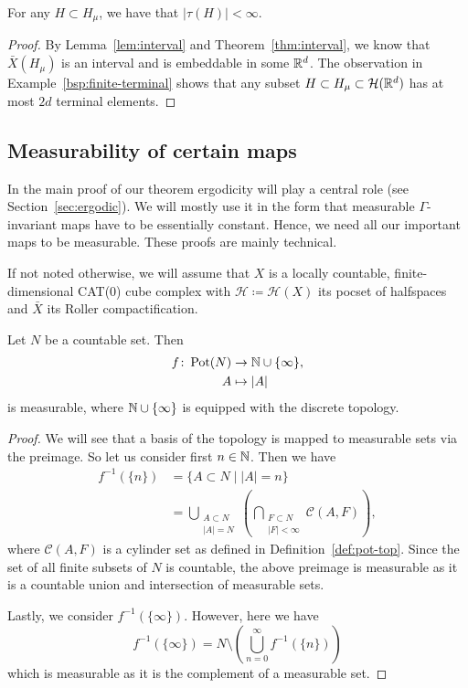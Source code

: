 \begin{lemma}
  \label{lem:finite-terminal}
  For any \(H \subset H_\mu\), we have that \(|\tau(H)| < \infty\).
\end{lemma}

\begin{proof}
  By Lemma~\ref{lem:interval} and Theorem~\ref{thm:interval}, we know that \(\bar X(H_\mu)\) is an interval and is embeddable in some \(\mathbb{R}^d\). The observation in Example~\ref{bsp:finite-terminal} shows that any subset \(H \subset H_\mu \subset \mathcal{H}(\mathbb{R}^d)\) has at most \(2d\) terminal elements.
\end{proof}

\subsection{Measurability of certain maps}
\label{sec:meas-maps}

In the main proof of our theorem ergodicity will play a central role (see Section~\ref{sec:ergodic}). We will mostly use it in the form that measurable \(\Gamma\)-invariant maps have to be essentially constant. Hence, we need all our important maps to be measurable. These proofs are mainly technical.

If not noted otherwise, we will assume that \(X\) is a locally countable, finite-dimensional CAT(0) cube complex with \(\mathcal{H} \coloneqq \mathcal{H}(X)\) its pocset of halfspaces and \(\bar X\) its Roller compactification.

\begin{lemma}
  \label{lem:measurable-countable}
  Let \(N\) be a countable set. Then
  \begin{align*}
    f\colon \operatorname{Pot}(N) &\to \mathbb{N} \cup \{\infty\},\\
    A &\mapsto |A|
  \end{align*}
  is measurable, where \(\mathbb{N} \cup \{\infty\}\) is equipped with the discrete topology.
\end{lemma}

\begin{proof}
  We will see that a basis of the topology is mapped to measurable sets via the preimage. So let us consider first \(n \in \mathbb{N}\). Then we have
  \begin{align*}
    f^{-1}(\{n\})
    & = \{ A \subset N \mid |A| = n\}\\
    & = \bigcup_{\substack{A \subset N\\|A| = N}} \left ( \bigcap_{\substack{F \subset N\\|F|< \infty}}\mathcal{C}(A,F)\right),
  \end{align*}
  where \(\mathcal{C}(A,F)\) is a cylinder set as defined in Definition~\ref{def:pot-top}. Since the set of all finite subsets of \(N\) is countable, the above preimage is measurable as it is a countable union and intersection of measurable sets.

  Lastly, we consider \(f^{-1}(\{\infty\})\). However, here we have
  \[
    f^{-1}(\{\infty\}) = N \setminus \left (\bigcup_{n=0}^\infty f^{-1}(\{n\})\right)
  \]
  which is measurable as it is the complement of a measurable set.
\end{proof}

